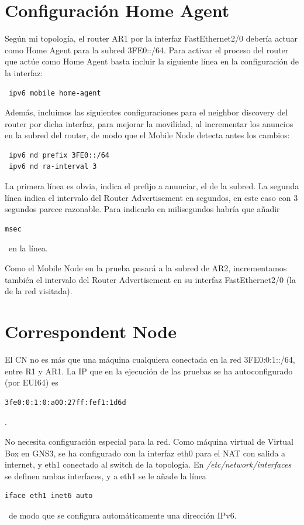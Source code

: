 \documentclass{article}
\begin{document}
\section{Configuración Home Agent}
Según mi topología, el router AR1 por la interfaz FastEthernet2/0 debería actuar como Home Agent para la subred 3FE0::/64. Para activar el proceso del router que actúe como Home Agent basta incluir la siguiente línea en la configuración de la interfaz:
\begin{BVerbatim}
 ipv6 mobile home-agent
\end{BVerbatim}

Además, incluimos las siguientes configuraciones para el neighbor discovery del router por dicha interfaz, para mejorar la movilidad, al incrementar los anuncios en la subred del router, de modo que el Mobile Node detecta antes los cambios:

\begin{BVerbatim}
 ipv6 nd prefix 3FE0::/64
 ipv6 nd ra-interval 3
\end{BVerbatim}

La primera línea es obvia, indica el prefijo a anunciar, el de la subred. La segunda línea indica el intervalo del Router Advertisement en segundos, en este caso con 3 segundos parece razonable. Para indicarlo en milisegundos habría que añadir
\begin{BVerbatim}
msec
\end{BVerbatim}
\ en la línea.

Como el Mobile Node en la prueba pasará a la subred de AR2, incrementamos también el intervalo del Router Advertisement en su interfaz FastEthernet2/0 (la de la red visitada).

\section{Correspondent Node}
El CN no es más que una máquina cualquiera conectada en la red 3FE0:0:1::/64, entre R1 y AR1. La IP que en la ejecución de las pruebas se ha autoconfigurado (por EUI64) es
\begin{BVerbatim}
3fe0:0:1:0:a00:27ff:fef1:1d6d
\end{BVerbatim}
.

No necesita configuración especial para la red. Como máquina virtual de Virtual Box en GNS3, se ha configurado con la interfaz eth0 para el NAT con salida a internet, y eth1 conectado al switch de la topología. En \textit{/etc/network/interfaces} se definen ambas interfaces, y a eth1 se le añade la línea
\begin{BVerbatim}
iface eth1 inet6 auto
\end{BVerbatim}
\ de modo que se configura automáticamente una dirección IPv6.
\end{document}
